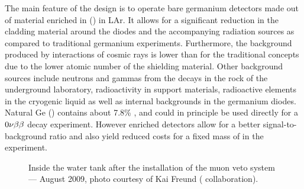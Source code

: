  The main feature of the {\gerda} design is to operate bare germanium detectors made out of material enriched in  () in LAr. It allows for a significant reduction in the cladding material around the diodes and the accompanying radiation sources as compared to traditional germanium experiments. Furthermore, the background produced by interactions of cosmic rays is lower than for the traditional concepts due to the lower atomic number of the shielding material. Other background sources include neutrons and gammas from the decays in the rock of the underground laboratory, radioactivity in support materials, radioactive elements in the cryogenic liquid as well as internal backgrounds in the germanium diodes. Natural Ge () contains about 7.8\% , and could in principle be used directly for a $0\nu\beta\beta$ decay experiment. However enriched detectors allow for a better signal-to-background ratio and also yield reduced costs for a fixed mass of  in the experiment.
\begin{figure}
	\centering
	\caption{Inside the water tank after the installation of the muon veto system --- August 2009, photo courtesy of Kai Freund ({\gerda} collaboration).}\label{fig:muonveto}
\end{figure}

